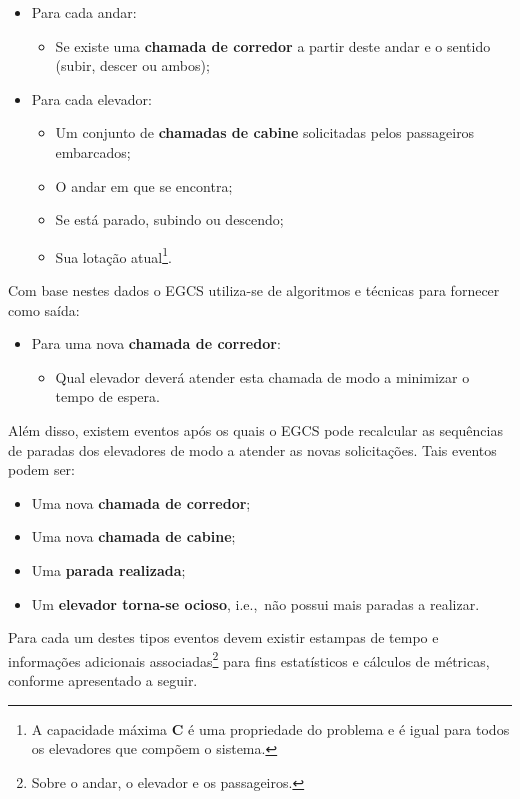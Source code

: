 \begin{itemize}
  \item Para cada andar:
  \begin{itemize}
    \item Se existe uma \textbf{chamada de corredor} a partir deste andar e o
          sentido (subir, descer ou ambos);
  \end{itemize}
  \item Para cada elevador:
  \begin{itemize}
    \item Um conjunto de \textbf{chamadas de cabine} solicitadas pelos
          passageiros embarcados;
    \item O andar em que se encontra;
    \item Se está parado, subindo ou descendo;
    \item Sua lotação atual\footnote{A capacidade máxima \textbf{C} é uma
          propriedade do problema e é igual para todos os elevadores que compõem
          o sistema.}.
  \end{itemize}
\end{itemize}

Com base nestes dados o EGCS utiliza-se de algoritmos e técnicas para fornecer
como saída:

\begin{itemize}
  \item Para uma nova \textbf{chamada de corredor}:
  \begin{itemize}
    \item Qual elevador deverá atender esta chamada de modo a minimizar o tempo de espera.
  \end{itemize}
\end{itemize}

Além disso, existem eventos após os quais o EGCS pode recalcular as sequências
de paradas dos elevadores de modo a atender as novas solicitações. Tais eventos
podem ser:

\begin{itemize}
  \item Uma nova \textbf{chamada de corredor};
  \item Uma nova \textbf{chamada de cabine};
  \item Uma \textbf{parada realizada};
  \item Um \textbf{elevador torna-se ocioso}, i.e.,~não possui mais paradas a realizar.
\end{itemize}

Para cada um destes tipos eventos devem existir estampas de tempo e informações
adicionais associadas\footnote{Sobre o andar, o elevador e os passageiros.} para
fins estatísticos e cálculos de métricas, conforme apresentado a seguir.

